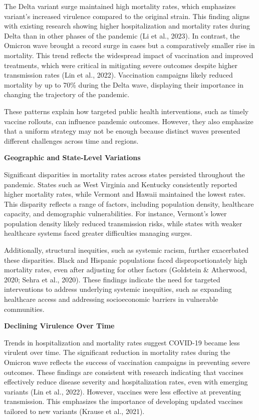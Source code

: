 \documentclass[
  letterpaper,
  DIV=11,
  numbers=noendperiod]{scrartcl}
\begin{document}
The Delta variant surge maintained high mortality rates, which
emphasizes variant's increased virulence compared to the original
strain. This finding aligns with existing research showing higher
hospitalization and mortality rates during Delta than in other phases of
the pandemic (Li et al., 2023). In contrast, the Omicron wave brought a
record surge in cases but a comparatively smaller rise in mortality.
This trend reflects the widespread impact of vaccination and improved
treatments, which were critical in mitigating severe outcomes despite
higher transmission rates (Lin et al., 2022). Vaccination campaigns
likely reduced mortality by up to 70\% during the Delta wave, displaying
their importance in changing the trajectory of the pandemic.

These patterns explain how targeted public health interventions, such as
timely vaccine rollouts, can influence pandemic outcomes. However, they
also emphasize that a uniform strategy may not be enough because
distinct waves presented different challenges across time and regions.

\textbf{Geographic and State-Level Variations}

Significant disparities in mortality rates across states persisted
throughout the pandemic. States such as West Virginia and Kentucky
consistently reported higher mortality rates, while Vermont and Hawaii
maintained the lowest rates. This disparity reflects a range of factors,
including population density, healthcare capacity, and demographic
vulnerabilities. For instance, Vermont's lower population density likely
reduced transmission risks, while states with weaker healthcare systems
faced greater difficulties managing surges.

Additionally, structural inequities, such as systemic racism, further
exacerbated these disparities. Black and Hispanic populations faced
disproportionately high mortality rates, even after adjusting for other
factors (Goldstein \& Atherwood, 2020; Sehra et al., 2020). These
findings indicate the need for targeted interventions to address
underlying systemic inequities, such as expanding healthcare access and
addressing socioeconomic barriers in vulnerable communities.

\textbf{Declining Virulence Over Time}

Trends in hospitalization and mortality rates suggest COVID-19 became
less virulent over time. The significant reduction in mortality rates
during the Omicron wave reflects the success of vaccination campaigns in
preventing severe outcomes. These findings are consistent with research
indicating that vaccines effectively reduce disease severity and
hospitalization rates, even with emerging variants (Lin et al., 2022).
However, vaccines were less effective at preventing transmission. This
emphasizes the importance of developing updated vaccines tailored to new
variants (Krause et al., 2021).
\end{document}
